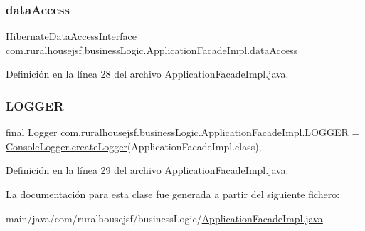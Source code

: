 \subsubsection{\texorpdfstring{dataAccess}{dataAccess}}
{\footnotesize\ttfamily \mbox{\hyperlink{interfacecom_1_1ruralhousejsf_1_1data_access_1_1_hibernate_data_access_interface}{Hibernate\+Data\+Access\+Interface}} com.\+ruralhousejsf.\+business\+Logic.\+Application\+Facade\+Impl.\+data\+Access\hspace{0.3cm}{\ttfamily [private]}}



Definición en la línea 28 del archivo Application\+Facade\+Impl.\+java.

\mbox{\label{classcom_1_1ruralhousejsf_1_1business_logic_1_1_application_facade_impl_a4d2aed9fcae945d5ffaa63947bb56cde}} 
\subsubsection{\texorpdfstring{LOGGER}{LOGGER}}
{\footnotesize\ttfamily final Logger com.\+ruralhousejsf.\+business\+Logic.\+Application\+Facade\+Impl.\+L\+O\+G\+G\+ER = \mbox{\hyperlink{classcom_1_1ruralhousejsf_1_1logger_1_1_console_logger_a520321643663e37d95761134a35505cd}{Console\+Logger.\+create\+Logger}}(Application\+Facade\+Impl.\+class)\hspace{0.3cm}{\ttfamily [static]}, {\ttfamily [private]}}



Definición en la línea 29 del archivo Application\+Facade\+Impl.\+java.



La documentación para esta clase fue generada a partir del siguiente fichero\+:\begin{DoxyCompactItemize}
\item 
main/java/com/ruralhousejsf/business\+Logic/\mbox{\hyperlink{_application_facade_impl_8java}{Application\+Facade\+Impl.\+java}}\end{DoxyCompactItemize}
